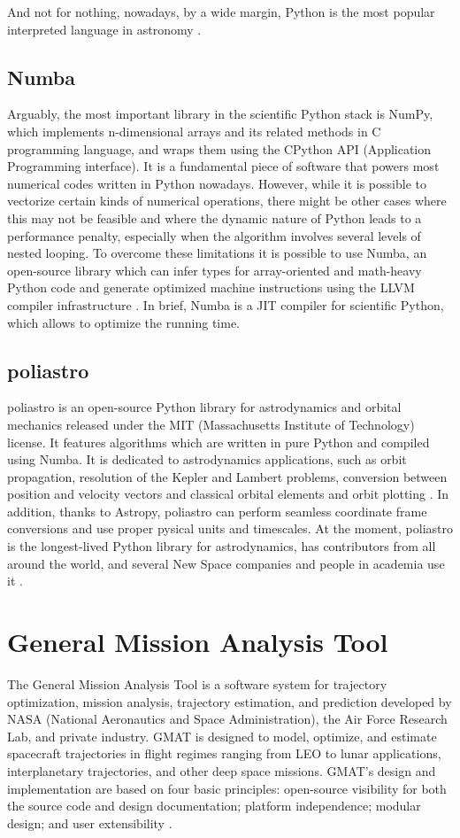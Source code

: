 And not for nothing, nowadays, by a wide margin, Python is the most popular interpreted language in astronomy
\cite{momcheva2015software}.

\subsection{Numba}
Arguably, the most important library in the scientific Python stack is NumPy, which implements n-dimensional arrays and its related methods in C programming language, and wraps them using the CPython API (Application Programming interface).
It is a fundamental piece of software that powers most numerical codes written in Python nowadays.
However, while it is possible to vectorize certain kinds of numerical operations, there might be other cases where this may not be feasible and where the dynamic nature of Python leads to a performance penalty, especially when the algorithm involves several levels of nested looping.
To overcome these limitations it is possible to use Numba, an open-source library which can infer types for array-oriented and math-heavy Python code and generate optimized machine instructions using the LLVM compiler infrastructure
\cite{rodriguez2016poliastro}.
In brief, Numba is a JIT compiler for scientific Python, which allows to optimize the running time.

\subsection{poliastro}
poliastro is an open-source Python library for astrodynamics and orbital mechanics released under the MIT (Massachusetts Institute of Technology) license.
It features algorithms which are written in pure Python and compiled using Numba.
It is dedicated to astrodynamics applications, such as orbit propagation, resolution of the Kepler and Lambert problems, conversion between position and velocity vectors and classical orbital elements and orbit plotting
\cite{rodriguez2016poliastro}.
In addition, thanks to Astropy, poliastro can perform seamless coordinate frame conversions and use proper pysical units and timescales.
At the moment, poliastro is the longest-lived Python library for astrodynamics, has contributors from all around the world, and several New Space companies and people in academia use it
\cite{rodriguez2022poliastro}.

\section{General Mission Analysis Tool}
The General Mission Analysis Tool is a software system for trajectory optimization, mission analysis, trajectory estimation, and prediction developed by NASA (National Aeronautics and Space Administration), the Air Force Research Lab, and private industry.
GMAT is designed to model, optimize, and estimate spacecraft trajectories in flight regimes ranging from LEO to lunar applications, interplanetary trajectories, and other deep space missions.
GMAT's design and implementation are based on four basic principles: open-source visibility for both the source code and design documentation; platform independence; modular design; and user extensibility
\cite{conway2010general}.
